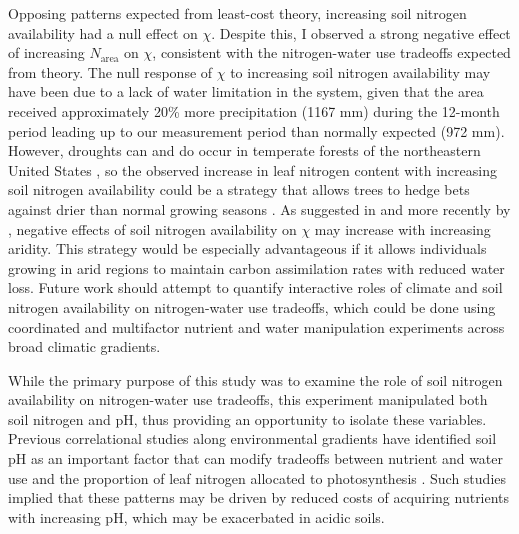 Opposing patterns expected from least-cost theory, increasing soil nitrogen availability had a null effect on $\chi$. Despite this, I observed a strong negative effect of increasing $N_\mathrm{area}$ on $\chi$, consistent with the nitrogen-water use tradeoffs expected from theory. The null response of $\chi$ to increasing soil nitrogen availability may have been due to a lack of water limitation in the system, given that the area received approximately 20\% more precipitation (1167 mm) during the 12-month period leading up to our measurement period than normally expected (972 mm). However, droughts can and do occur in temperate forests of the northeastern United States , so the observed increase in leaf nitrogen content with increasing soil nitrogen availability could be a strategy that allows trees to hedge bets against drier than normal growing seasons . As suggested in  and more recently by , negative effects of soil nitrogen availability on $\chi$ may increase with increasing aridity. This strategy would be especially advantageous if it allows individuals growing in arid regions to maintain carbon assimilation rates with reduced water loss. Future work should attempt to quantify interactive roles of climate and soil nitrogen availability on nitrogen-water use tradeoffs, which could be done using coordinated and multifactor nutrient  and water  manipulation experiments across broad climatic gradients.
    
While the primary purpose of this study was to examine the role of soil nitrogen availability on nitrogen-water use tradeoffs, this experiment manipulated both soil nitrogen and pH, thus providing an opportunity to isolate these variables. Previous correlational studies along environmental gradients have identified soil pH as an important factor that can modify tradeoffs between nutrient and water use  and the proportion of leaf nitrogen allocated to photosynthesis . Such studies implied that these patterns may be driven by reduced costs of acquiring nutrients with increasing pH, which may be exacerbated in acidic soils.

